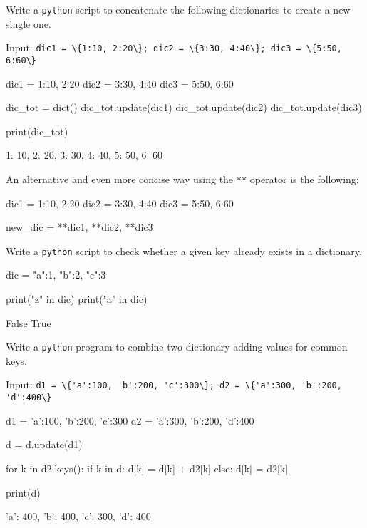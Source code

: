 \begin{question}
Write a \texttt{python} script to concatenate the following dictionaries to create a new single one.

\noindent 
Input:
\lstinline[language=iPython]|dic1 = \{1:10, 2:20\}; dic2 = \{3:30, 4:40\}; dic3 = \{5:50, 6:60\}|
\end{question}

\cprotEnv\begin{solution}
\begin{ipython}
dic1 = {1:10, 2:20}
dic2 = {3:30, 4:40}
dic3 = {5:50, 6:60}

dic_tot = dict()
dic_tot.update(dic1)
dic_tot.update(dic2)
dic_tot.update(dic3)

print(dic_tot)
\end{ipython}
\begin{ioutput}
{1: 10, 2: 20, 3: 30, 4: 40, 5: 50, 6: 60}
\end{ioutput}

An alternative and even more concise way using the \texttt{**} operator is the following:
\begin{ipython}
dic1 = {1:10, 2:20}
dic2 = {3:30, 4:40}
dic3 = {5:50, 6:60}

new_dic = {**dic1, **dic2, **dic3}
\end{ipython}
\end{solution}

\begin{question}
Write a \texttt{python} script to check whether a given key already exists in a dictionary.
\end{question}

\cprotEnv\begin{solution}
\begin{ipython}
dic = {"a":1, "b":2, "c":3}

print("z" in dic)
print("a" in dic)
\end{ipython}
\begin{ioutput}
False
True
\end{ioutput}
\end{solution}

\begin{question}
Write a \texttt{python} program to combine two dictionary adding values for common keys.

\noindent
Input: \lstinline[language=iPython]|d1 = \{'a':100, 'b':200, 'c':300\}; d2 = \{'a':300, 'b':200, 'd':400\}|
\end{question}

\cprotEnv\begin{solution}
\begin{ipython}
d1 = {'a':100, 'b':200, 'c':300}
d2 = {'a':300, 'b':200, 'd':400}

d = {}
d.update(d1)

for k in d2.keys():
    if k in d:
        d[k] = d[k] + d2[k]
    else:
        d[k] = d2[k]

print(d)
\end{ipython}
\begin{ioutput}
{'a': 400, 'b': 400, 'c': 300, 'd': 400}
\end{ioutput}
\end{solution}

